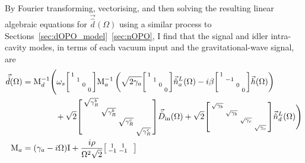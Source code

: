 By Fourier transforming, vectorising, and then solving the resulting linear algebraic equations for $\vec{\hat d}(\Omega)$ using a similar process to Sections~\ref{sec:dOPO_model}~\ref{sec:nOPO}, I find that the signal and idler intra-cavity modes, in terms of each vacuum input and the gravitational-wave signal, are
\begin{align}\label{eq:nIS_vecb}
\vec{\hat{d}}(\Omega)&= \mathrm{M}_d^{-1}\Biggl(\omega_s\begin{bsmallmatrix}
1 &  &  &  \\
 & 1 &  &  \\
 &  & 0 &  \\
 &  &  & 0
\end{bsmallmatrix}\mathrm{M}_a^{-1}\left(\sqrt{2\gamma_a}\begin{bsmallmatrix}
1 &  &  &  \\
 & 1 &  &  \\
 &  & 0 &  \\
 &  &  & 0
\end{bsmallmatrix}\vec{\hat{n}}^L_a(\Omega)-i\beta\begin{bsmallmatrix}
1 &  &  &  \\
 & -1 &  &  \\
 &  & 0 &  \\
 &  &  & 0
\end{bsmallmatrix}\vec{h}(\Omega)\right)\\&\hspace{1.4cm}+ \sqrt{2}\begin{bsmallmatrix}
\sqrt{\gamma^b_R} &  &  &  \\
 & \sqrt{\gamma^b_R} &  &  \\
 &  & \sqrt{\gamma^c_R} &  \\
 &  &  & \sqrt{\gamma^c_R}
\end{bsmallmatrix}\vec{\hat D}_\mathrm{in}(\Omega) + \sqrt{2}\begin{bsmallmatrix}
\sqrt{\gamma_b} &  &  &  \\
 & \sqrt{\gamma_b} &  &  \\
 &  & \sqrt{\gamma_c} &  \\
 &  &  & \sqrt{\gamma_c}
\end{bsmallmatrix}\vec{\hat n}^L_d(\Omega)\Biggr)\nonumber\\
\mathrm{M}_a &= (\gamma_a-i\Omega)\mathrm{I}+\frac{i\rho}{\Omega^2 \sqrt{2}}\begin{bsmallmatrix}
1 & 1 &  &  \\
-1 & -1 &  &  \\

\end{bsmallmatrix}
\end{align}
